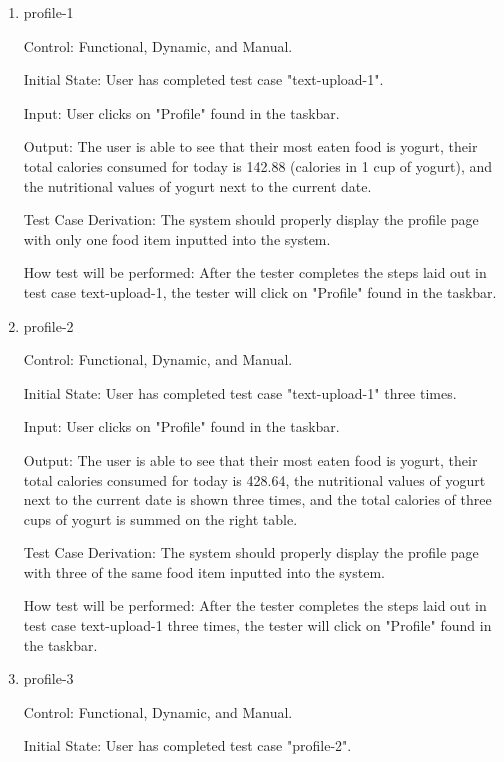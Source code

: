 \documentclass[12pt, titlepage]{article}
\begin{document}
	\begin{enumerate}
		\item{profile-1\\}
		
		Control: Functional, Dynamic, and Manual.
		
		Initial State: User has completed test case "text-upload-1".
		
		Input: User clicks on "Profile" found in the taskbar.
		
		Output: The user is able to see that their most eaten food is yogurt, their total calories consumed for today is 142.88 (calories in 1 cup of yogurt), and the nutritional values of yogurt next to the current date.
		
		Test Case Derivation: The system should properly display the profile page with only one food item inputted into the system.
		
		How test will be performed: After the tester completes the steps laid out in test case text-upload-1, the tester will click on "Profile" found in the taskbar.
		
		\item{profile-2\\}
		
		Control: Functional, Dynamic, and Manual.
		
		Initial State: User has completed test case "text-upload-1" three times.
		
		Input: User clicks on "Profile" found in the taskbar.
		
		Output: The user is able to see that their most eaten food is yogurt, their total calories consumed for today is 428.64, the nutritional values of yogurt next to the current date is shown three times, and the total calories of three cups of yogurt is summed on the right table.
		
		Test Case Derivation: The system should properly display the profile page with three of the same food item inputted into the system.
		
		How test will be performed: After the tester completes the steps laid out in test case text-upload-1 three times, the tester will click on "Profile" found in the taskbar.
		
		\item{profile-3\\}
		
		Control: Functional, Dynamic, and Manual.
		
		Initial State: User has completed test case "profile-2".
		

\end{enumerate}
\end{document}
